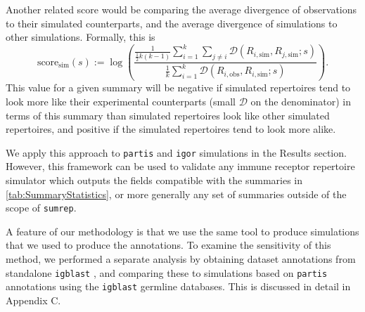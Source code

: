 \documentclass{article}
\begin{document}
Another related score would be comparing the average divergence of observations to their simulated counterparts, and the average divergence of simulations to other simulations.
Formally, this is
\begin{equation}
    \text{score}_\text{sim}(s) :=
    \log \left(
        \frac{
            \frac{1}{\frac{1}{2} k\left(k - 1\right)}
            \sum_{i=1}^{k}
            \sum_{j \ne i}
                \mathcal D\left(R_{i, \text{sim}}, R_{j, \text{sim}}; s\right)
        }
        {
            \frac{1}{k}
            \sum_{i = 1}^k
                \mathcal D \left( R_{i, \text{obs}}, R_{i, \text{sim}} ; s\right)
        }
    \right).
\end{equation}
This value for a given summary will be negative if simulated repertoires tend to look more like their experimental counterparts (small $\mathcal D$ on the denominator) in terms of this summary than simulated repertoires look like other simulated repertoires, and positive if the simulated repertoires tend to look more alike.

We apply this approach to \texttt{partis} and \texttt{igor} simulations in the Results section.
However, this framework can be used to validate any immune receptor repertoire simulator which outputs the fields compatible with the summaries in \ref{tab:SummaryStatistics}, or more generally any set of summaries outside of the scope of \texttt{sumrep}.

A feature of our methodology is that we use the same tool to produce simulations that we used to produce the annotations.
To examine the sensitivity of this method, we performed a separate analysis by obtaining dataset annotations from standalone \texttt{igblast} \cite{Ye2013-kl}, and comparing these to simulations based on \texttt{partis} annotations using the \texttt{igblast} germline databases.
This is discussed in detail in Appendix C.
\end{document}
